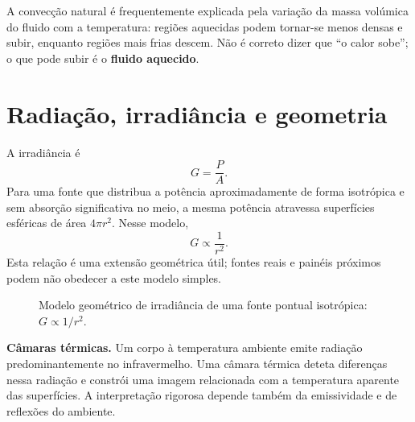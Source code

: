 \documentclass[11pt,a4paper,oneside]{book}
\begin{document}
\begin{nota}
A convecção natural é frequentemente explicada pela variação da massa volúmica do fluido com a temperatura: regiões aquecidas podem tornar-se menos densas e subir, enquanto regiões mais frias descem. Não é correto dizer que ``o calor sobe''; o que pode subir é o \textbf{fluido aquecido}.
\end{nota}

\section{Radiação, irradiância e geometria}
A irradiância é
\[
G=\frac{P}{A}.
\]
Para uma fonte que distribua a potência aproximadamente de forma isotrópica e sem absorção significativa no meio, a mesma potência atravessa superfícies esféricas de área $4\pi r^2$. Nesse modelo,
\[
G\propto\frac{1}{r^2}.
\]
Esta relação é uma extensão geométrica útil; fontes reais e painéis próximos podem não obedecer a este modelo simples.

\begin{figure}[H]
\centering
{}
\caption{Modelo geométrico de irradiância de uma fonte pontual isotrópica: $G\propto1/r^2$.}
\end{figure}

\begin{mundo}
\textbf{Câmaras térmicas.} Um corpo à temperatura ambiente emite radiação predominantemente no infravermelho. Uma câmara térmica deteta diferenças nessa radiação e constrói uma imagem relacionada com a temperatura aparente das superfícies. A interpretação rigorosa depende também da emissividade e de reflexões do ambiente.
\end{mundo}
\end{document}
